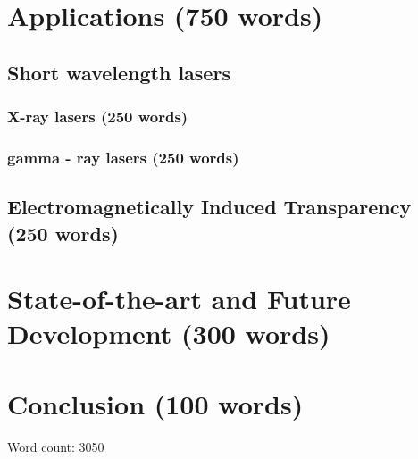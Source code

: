 \documentclass{article}
\begin{document}
\section{Applications (750 words)}
\subsection{Short wavelength lasers}
\subsubsection{X-ray lasers (250 words)}
\subsubsection{gamma - ray lasers (250 words)}
\subsection{Electromagnetically Induced Transparency (250 words)}

\section{State-of-the-art and Future Development (300 words)}

\section{Conclusion (100 words)}

Word count: 3050
\end{document}
